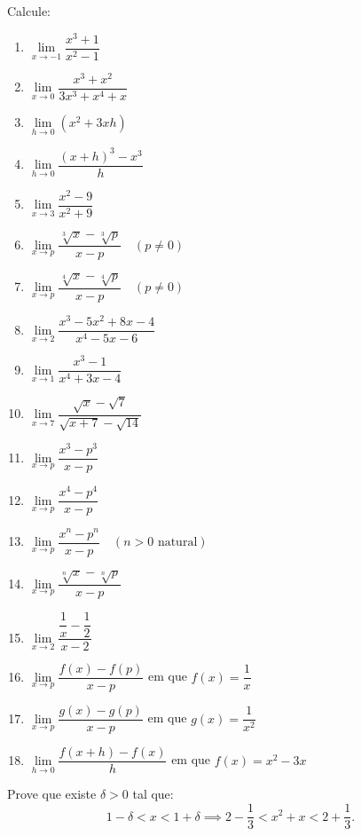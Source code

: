 \begin{exercicio}[5]
Calcule:
\begin{enumerate}[label=\alph*)]
    \item $\lim\limits_{x \to -1} \dfrac{x^3 + 1}{x^2 - 1}$
    \item $\lim\limits_{x \to 0} \dfrac{x^3 + x^2}{3x^3 + x^4 + x}$
    \item $\lim\limits_{h \to 0} (x^2 + 3xh)$
    \item $\lim\limits_{h \to 0} \dfrac{(x + h)^3 - x^3}{h}$
    \item $\lim\limits_{x \to 3} \dfrac{x^2 - 9}{x^2 + 9}$
    \item $\lim\limits_{x \to p} \dfrac{\sqrt[3]{x} - \sqrt[3]{p}}{x - p} \quad (p \neq 0)$
    \item $\lim\limits_{x \to p} \dfrac{\sqrt[4]{x} - \sqrt[4]{p}}{x - p} \quad (p \neq 0)$
    \item $\lim\limits_{x \to 2} \dfrac{x^3 - 5x^2 + 8x - 4}{x^4 - 5x - 6}$
    \item $\lim\limits_{x \to 1} \dfrac{x^3 - 1}{x^4 + 3x - 4}$
    \item $\lim\limits_{x \to 7} \dfrac{\sqrt{x} - \sqrt{7}}{\sqrt{x + 7} - \sqrt{14}}$
    \item $\lim\limits_{x \to p} \dfrac{x^3 - p^3}{x - p}$
    \item $\lim\limits_{x \to p} \dfrac{x^4 - p^4}{x - p}$
    \item $\lim\limits_{x \to p} \dfrac{x^n - p^n}{x - p} \quad (n > 0 \text{ natural})$
    \item $\lim\limits_{x \to p} \dfrac{\sqrt[n]{x} - \sqrt[n]{p}}{x - p}$
    \item $\lim\limits_{x \to 2} \dfrac{\dfrac{1}{x} - \dfrac{1}{2}}{x - 2}$
    \item $\lim\limits_{x \to p} \dfrac{f(x) - f(p)}{x - p}$ em que $f(x) = \dfrac{1}{x}$
    \item $\lim\limits_{x \to p} \dfrac{g(x) - g(p)}{x - p}$ em que $g(x) = \dfrac{1}{x^2}$
    \item $\lim\limits_{h \to 0} \dfrac{f(x + h) - f(x)}{h}$ em que $f(x) = x^2 - 3x$
\end{enumerate}
\end{exercicio}

\begin{exercicio}[6]
Prove que existe $\delta > 0$ tal que:
\[
1 - \delta < x < 1 + \delta \implies 2 - \dfrac{1}{3} < x^2 + x < 2 + \dfrac{1}{3}.
\]
\end{exercicio}

